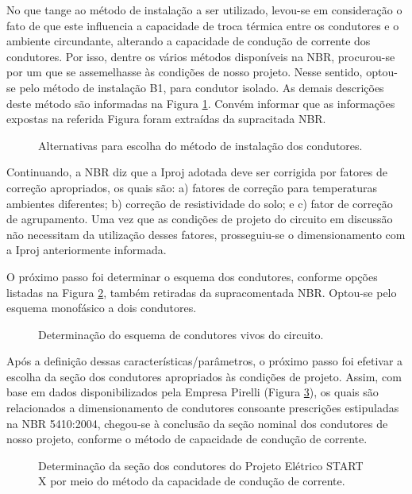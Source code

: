 No que tange ao método de instalação a ser utilizado, levou-se em consideração o fato de que este influencia a capacidade de troca térmica entre os condutores e o ambiente circundante, alterando a capacidade de condução de corrente dos condutores. Por isso, dentre os vários métodos disponíveis na NBR, procurou-se por um que se assemelhasse às condições de nosso projeto. Nesse sentido, optou-se pelo método de instalação B1, para condutor isolado. As demais descrições deste método são informadas na Figura \ref{metodos-condutores}. Convém informar que as informações expostas na referida Figura foram extraídas da supracitada NBR.

\begin{figure}[h]
	\centering
	\caption{Alternativas para escolha do método de instalação dos condutores.}
	\label{metodos-condutores}
\end{figure}

 Continuando, a NBR diz que a Iproj adotada deve ser corrigida por fatores de correção apropriados, os quais são: a) fatores de correção para temperaturas ambientes diferentes; b) correção de resistividade do solo; e c) fator de correção de agrupamento. Uma vez que as condições de projeto do circuito em discussão não necessitam da utilização desses fatores, prosseguiu-se o dimensionamento com a Iproj anteriormente informada.
 
 O próximo passo foi determinar o esquema dos condutores, conforme opções listadas na Figura \ref{esquema-condutores}, também retiradas da supracomentada NBR. Optou-se pelo esquema monofásico a dois condutores.
 
 \begin{figure}[h]
	\centering
	\caption{Determinação do esquema de condutores vivos do circuito.}
	\label{esquema-condutores}
\end{figure}

Após a definição dessas características/parâmetros, o próximo passo foi efetivar a escolha da seção dos condutores apropriados às condições de projeto. Assim, com base em dados disponibilizados pela Empresa Pirelli (Figura \ref{secao-condutores}), os quais são relacionados a dimensionamento de condutores consoante prescrições estipuladas na NBR 5410:2004, chegou-se à conclusão da seção nominal dos condutores de nosso projeto, conforme o método de capacidade de condução de corrente.

 \begin{figure}[h]
	\centering
	\caption{Determinação da seção dos condutores do Projeto Elétrico START X por meio do método da capacidade de condução de corrente.}
	\label{secao-condutores}
\end{figure}

